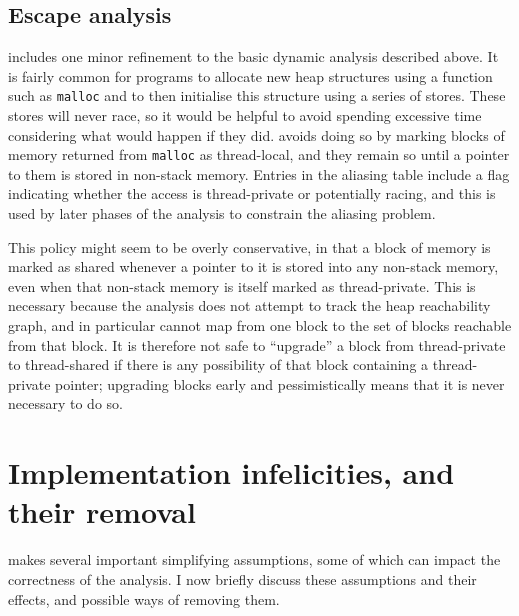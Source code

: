 \subsection{Escape analysis}
{\Implementation} includes one minor refinement to the basic dynamic
analysis described above.  It is fairly common for programs to
allocate new heap structures using a function such as \texttt{malloc}
and to then initialise this structure using a series of stores.  These
stores will never race, so it would be helpful to avoid spending
excessive time considering what would happen if they did.
{\Technique} avoids doing so by marking blocks of memory returned from
\texttt{malloc} as thread-local, and they remain so until a pointer to
them is stored in non-stack memory.  Entries in the aliasing table
include a flag indicating whether the access is thread-private or
potentially racing, and this is used by later phases of the analysis
to constrain the aliasing problem.

This policy might seem to be overly conservative, in that a block of
memory is marked as shared whenever a pointer to it is stored into any
non-stack memory, even when that non-stack memory is itself marked as
thread-private.  This is necessary because the analysis does not
attempt to track the heap reachability graph, and in particular cannot
map from one block to the set of blocks reachable from that block.  It
is therefore not safe to ``upgrade'' a block from thread-private to
thread-shared if there is any possibility of that block containing a
thread-private pointer; upgrading blocks early and pessimistically
means that it is never necessary to do so.

\section{Implementation infelicities, and their removal}

\noindent
{\Implementation} makes several important simplifying assumptions,
some of which can impact the correctness of the analysis.  I now
briefly discuss these assumptions and their effects, and possible ways
of removing them.

